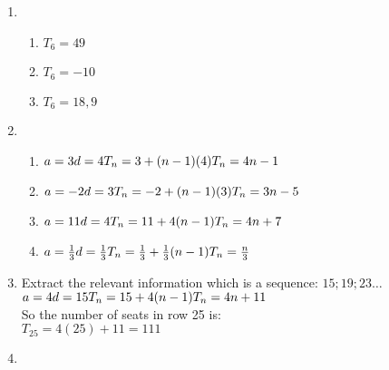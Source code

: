  \begin{solutions}{}{
\begin{enumerate}[noitemsep, label=\textbf{\arabic*}. ] 
\item 
  \begin{enumerate}[noitemsep, label=\textbf{(\alph*)} ]
  \item $T_6 = 49$
  \item $T_6 = -10$
  \item $T_6 = 18,9$
  \end{enumerate}
\item 
  \begin{enumerate}[noitemsep, label=\textbf{(\alph*)} ]
  \item $a = 3\\
d = 4\\
T_n = 3 + (n - 1)(4)\\
T_n = 4n - 1$ 
  \item $a = -2\\
d = 3\\
T_n = -2 + (n-1)(3) \\
T_n = 3n -5$ 
  \item $a = 11\\
d = 4\\
T_n = 11 + 4(n-1)\\
T_n = 4n + 7 $ 
  \item $a = \frac{1}{3}\\
d = \frac{1}{3}\\
T_n = \frac{1}{3} + \frac{1}{3}(n - 1)\\
T_n = \frac{n}{3} $ 
  \end{enumerate}
\item Extract the relevant information which is a sequence: $15; 19 ; 23 \ldots$\\
 $a = 4\\
d = 15\\
T_n = 15 + 4(n - 1)\\
T_n = 4n + 11 $ \\
So the number of seats in row 25 is:\\
$T_{25} = 4(25) + 11 = 111$ 
\item 
\end{enumerate}}
\end{solutions}
